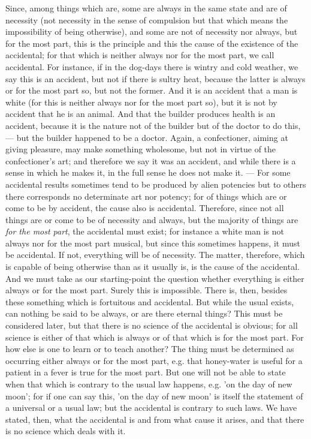 Since, among things which are, some are always in the same state and are of necessity (not necessity in the sense of compulsion but that which means the impossibility of being otherwise), and some are not of necessity nor always, but for the most part, this is the principle and this the cause of the existence of the accidental; for that which is neither always nor for the most part, we call accidental. For instance, if in the dog-days there is wintry and cold weather, we say this is an accident, but not if there is sultry heat, because the latter is always or for the most part so, but not the former. And it is an accident that a man is white (for this is neither always nor for the most part so), but it is not by accident that he is an animal. And that the builder produces health is an accident, because it is the nature not of the builder but of the doctor to do this, — but the builder happened to be a doctor. Again, a confectioner, aiming at giving pleasure, may make something wholesome, but not in virtue of the confectioner's art; and therefore we say it was an accident, and while there is a sense in which he makes it, in the full sense he does not make it. — For some accidental results sometimes tend to be produced by alien potencies but to others there corresponds no determinate art nor potency; for of things which are or come to be by accident, the cause also is accidental. Therefore, since not all things are or come to be of necessity and always, but the majority of things are \emph{for the most part}, the accidental must exist; for instance a white man is not always nor for the most part musical, but since this sometimes happens, it must be accidental. If not, everything will be of necessity. The matter, therefore, which is capable of being otherwise than as it usually is, is the cause of the accidental. And we must take as our starting-point the question whether everything is either always or for the most part. Surely this is impossible. There is, then, besides these something which is fortuitous and accidental. But while the usual exists, can nothing be said to be always, or are there eternal things? This must be considered later, but that there is no science of the accidental is obvious; for all science is either of that which is always or of that which is for the most part. For how else is one to learn or to teach another? The thing must be determined as occurring either always or for the most part, e.g. that honey-water is useful for a patient in a fever is true for the most part. But one will not be able to state when that which is contrary to the usual law happens, e.g. 'on the day of new moon'; for if one can say this, 'on the day of new moon' is itself the statement of a universal or a usual law; but the accidental is contrary to such laws. We have stated, then, what the accidental is and from what cause it arises, and that there is no science which deals with it.

